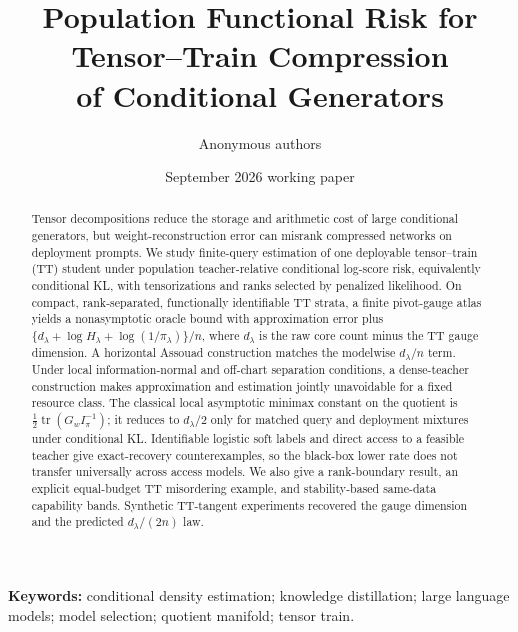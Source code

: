 \documentclass[11pt]{article}
\title{Population Functional Risk for Tensor--Train Compression\\
of Conditional Generators}
\author{Anonymous authors}
\date{September 2026 working paper}
\newcommand{\tr}{\operatorname{tr}}
\begin{document}
\maketitle

\begin{abstract}
Tensor decompositions reduce the storage and arithmetic cost of large conditional generators, but weight-reconstruction error can misrank compressed networks on deployment prompts. We study finite-query estimation of one deployable tensor--train (TT) student under population teacher-relative conditional log-score risk, equivalently conditional KL, with tensorizations and ranks selected by penalized likelihood. On compact, rank-separated, functionally identifiable TT strata, a finite pivot-gauge atlas yields a nonasymptotic oracle bound with approximation error plus \(\{d_\lambda+\log H_\lambda+\log(1/\pi_\lambda)\}/n\), where \(d_\lambda\) is the raw core count minus the TT gauge dimension. A horizontal Assouad construction matches the modelwise \(d_\lambda/n\) term. Under local information-normal and off-chart separation conditions, a dense-teacher construction makes approximation and estimation jointly unavoidable for a fixed resource class. The classical local asymptotic minimax constant on the quotient is \(\tfrac12\tr(G_w I_\pi^{-1})\); it reduces to \(d_\lambda/2\) only for matched query and deployment mixtures under conditional KL\@. Identifiable logistic soft labels and direct access to a feasible teacher give exact-recovery counterexamples, so the black-box lower rate does not transfer universally across access models. We also give a rank-boundary result, an explicit equal-budget TT misordering example, and stability-based same-data capability bands. Synthetic TT-tangent experiments recovered the gauge dimension and the predicted \(d_\lambda/(2n)\) law.
\end{abstract}

\noindent\textbf{Keywords:} conditional density estimation; knowledge distillation; large language models; model selection; quotient manifold; tensor train.












\appendix







\end{document}
